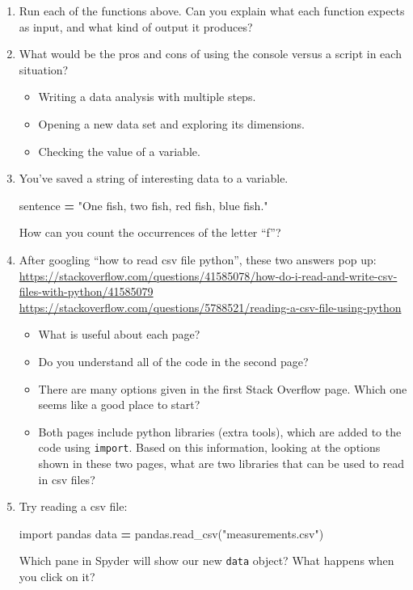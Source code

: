 \documentclass[]{Nemilov}
\newenvironment{Shaded}{\begin{snugshade}}{\end{snugshade}}
\newcommand{\ImportTok}[1]{#1}
\newcommand{\NormalTok}[1]{#1}
\newcommand{\OperatorTok}[1]{\textcolor[rgb]{0.81,0.36,0.00}{\textbf{#1}}}
\newcommand{\StringTok}[1]{\textcolor[rgb]{0.31,0.60,0.02}{#1}}
\providecommand{\tightlist}{%
  \setlength{\itemsep}{0pt}\setlength{\parskip}{0pt}}
\begin{document}
\begin{enumerate}
\def\labelenumi{\arabic{enumi}.}
\item
  Run each of the functions above. Can you explain what each function
  expects as input, and what kind of output it produces?
\item
  What would be the pros and cons of using the console versus a script in each situation?

  \begin{itemize}
  \tightlist
  \item
    Writing a data analysis with multiple steps.
  \item
    Opening a new data set and exploring its dimensions.
  \item
    Checking the value of a variable.
  \end{itemize}
\item
  You've saved a string of interesting data to a variable.

\begin{Shaded}
\begin{Highlighting}[]
\NormalTok{sentence }\OperatorTok{=} \StringTok{"One fish, two fish, red fish, blue fish."}
\end{Highlighting}
\end{Shaded}

  How can you count the occurrences of the letter ``f''?
\item
  After googling ``how to read csv file python'', these two answers pop up:
  \url{https://stackoverflow.com/questions/41585078/how-do-i-read-and-write-csv-files-with-python/41585079}
  \url{https://stackoverflow.com/questions/5788521/reading-a-csv-file-using-python}

  \begin{itemize}
  \tightlist
  \item
    What is useful about each page?
  \item
    Do you understand all of the code in the second page?
  \item
    There are many options given in the first Stack Overflow page. Which one seems like a good place to start?
  \item
    Both pages include python libraries (extra tools), which are added to the
    code using \texttt{import}. Based on this information, looking at the options shown
    in these two pages, what are two libraries that can be used to
    read in csv files?
  \end{itemize}
\item
  Try reading a csv file:

\begin{Shaded}
\begin{Highlighting}[]
\ImportTok{import}\NormalTok{ pandas}
\NormalTok{data }\OperatorTok{=}\NormalTok{ pandas.read_csv(}\StringTok{"measurements.csv"}\NormalTok{)}
\end{Highlighting}
\end{Shaded}

  Which pane in Spyder will show our new \texttt{data} object? What happens when you click on it?
\end{enumerate}
\end{document}
